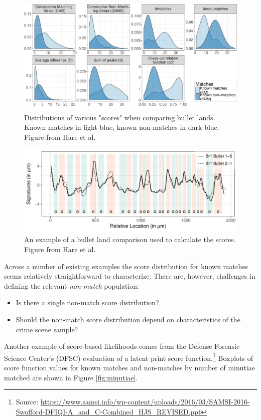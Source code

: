 \documentclass[]{book}
\providecommand{\tightlist}{%
  \setlength{\itemsep}{0pt}\setlength{\parskip}{0pt}}
\let\rmarkdownfootnote\footnote%
\def\footnote{\protect\rmarkdownfootnote}
\theoremstyle{definition}
\theoremstyle{definition}
\theoremstyle{remark}
\begin{document}
\begin{figure}

{\centering \includegraphics[width=.65\linewidth]{img/density-overview-1} 

}

\caption{Distributions of various "scores" when comparing bullet lands. Known matches in light blue, known non-matches in dark blue. Figure from Hare et al.}\label{fig:scorebullet}
\end{figure}

\begin{figure}

{\centering \includegraphics[width=.65\linewidth]{img/smoothmatch-1} 

}

\caption{An example of a bullet land comparison used to calculate the scores. Figure from Hare et al.}\label{fig:comparebullet}
\end{figure}

Across a number of existing examples the score distribution for known
matches seems relatively straightforward to characterize. There are,
however, challenges in defining the relevant \emph{non-match}
population:

\begin{itemize}
\tightlist
\item
  Is there a single non-match score distribution?
\item
  Should the non-match score distribution depend on characteristics of
  the crime scene sample?
\end{itemize}

Another example of score-based likelihoods comes from the Defense
Forensic Science Center's (DFSC) evaluation of a latent print score
function.\footnote{Source:
  \url{https://www.samsi.info/wp-content/uploads/2016/03/SAMSI-2016-Swofford-DFIQI-A_and_C-Combined_HJS_REVISED.ppt}}
Boxplots of score function values for known matches and non-matches by
number of minutiae matched are shown in Figure \ref{fig:minutiae}.
\end{document}
